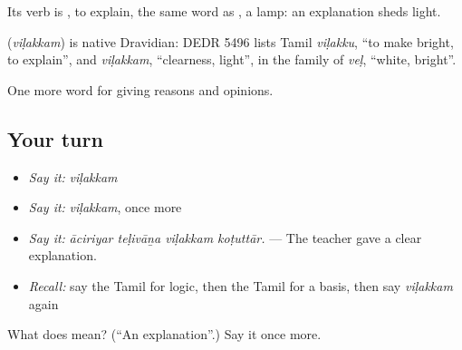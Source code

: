 Its verb is , to explain, the same word as , a lamp: an explanation sheds light.

\begin{cousinweb}
\textbf{} (\emph{viḷakkam}) is native Dravidian: DEDR 5496 lists Tamil \emph{viḷakku}, \textquotedblleft{}to make bright, to explain\textquotedblright{}, and \emph{viḷakkam}, \textquotedblleft{}clearness, light\textquotedblright{}, in the family of \emph{veḷ}, \textquotedblleft{}white, bright\textquotedblright{}.
\end{cousinweb}

\begin{grammarlens}[title={What you've built}]
One more word for giving reasons and opinions.
\end{grammarlens}

\subsection*{Your turn}
\begin{itemize}
\raggedright
  \item \emph{Say it:} \emph{viḷakkam}
  \item \emph{Say it:} \emph{viḷakkam}, once more
  \item \emph{Say it:} \emph{āciriyar teḷivāṉa viḷakkam koṭuttār.} — The teacher gave a clear explanation.
  \item \emph{Recall:} say the Tamil for logic, then the Tamil for a basis, then say \emph{viḷakkam} again
\end{itemize}

\begin{tcolorbox}[breakable,colback=teal!4,colframe=teal!35!black,title={Before you move on}]
What does  mean? (\textquotedblleft{}An explanation\textquotedblright{}.) Say it once more.
\end{tcolorbox}
